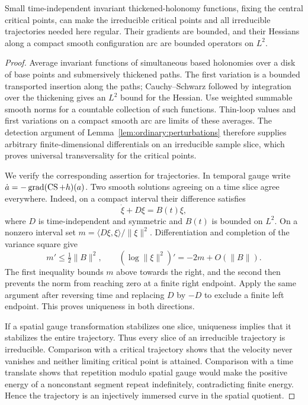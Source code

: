 \begin{lemma}
\label{lem:ordinary:gradient-transversality}
Small time-independent invariant thickened-holonomy functions, fixing
the central critical points, can make the irreducible critical points
and all irreducible trajectories needed here regular.  Their
gradients are bounded, and their Hessians along a compact smooth
configuration arc are bounded operators on $L^2$.
\end{lemma}
\begin{proof}
Average invariant functions of simultaneous based holonomies over
a disk of base points and submersively thickened paths.  The first
variation is a bounded transported insertion along the paths;
Cauchy--Schwarz followed by integration over the thickening gives
an $L^2$ bound for the Hessian.  Use weighted summable smooth norms
for a countable collection of such functions.  Thin-loop values
and first variations on a compact smooth arc are limits of these
averages.  The detection argument of
Lemma~\ref{lem:ordinary:perturbations} therefore supplies arbitrary
finite-dimensional differentials on an irreducible sample slice,
which proves universal transversality for the critical points.

We verify the corresponding assertion for trajectories.  In temporal
gauge write $\dot a=-\operatorname{grad}(\operatorname{CS}+h)(a)$.  Two smooth
solutions agreeing on a time slice agree everywhere.  Indeed, on
a compact interval their difference satisfies
\[
 \dot\xi+D\xi=B(t)\xi,
\]
where $D$ is time-independent and symmetric and $B(t)$ is bounded
on $L^2$.  On a nonzero interval set
$m=\langle D\xi,\xi\rangle/\|\xi\|^2$.  Differentiation and
completion of the variance square give
\[
 m'\le \tfrac12\|B\|^2,
 \qquad
 (\log\|\xi\|^2)'=-2m+O(\|B\|).
\]
The first inequality bounds $m$ above towards the right, and the
second then prevents the norm from reaching zero at a finite
right endpoint.  Apply the same argument after reversing time and
replacing $D$ by $-D$ to exclude a finite left endpoint.  This proves
uniqueness in both directions.

If a spatial gauge transformation stabilizes one slice, uniqueness
implies that it stabilizes the entire trajectory.  Thus every slice
of an irreducible trajectory is irreducible.  Comparison with a
critical trajectory shows that the velocity never vanishes and
neither limiting critical point is attained.  Comparison with a
time translate shows that repetition modulo spatial gauge would
make the positive energy of a nonconstant segment repeat
indefinitely, contradicting finite energy.  Hence the trajectory
is an injectively immersed curve in the spatial quotient.


\end{proof}
